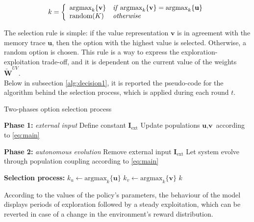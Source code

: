 \begin{equation*}
    k =
    \left\{
        \begin{array}{ll}
            \text{argmax}_{k}\{\textbf{v}\} & \text{\textit{if}}\; \text{argmax}_{k} \{\textbf{v}\} = \text{argmax}_{k} \{\textbf{u}\} \\
            \text{random}(K) & \text{\textit{otherwise}}
        \end{array}
    \right.
\end{equation*}

\noindent The selection rule is simple: if the value representation $\textbf{v}$ is in agreement with the memory trace $\textbf{u}$, then the option with the highest value is selected. Otherwise, a random option is chosen.
This rule is a way to express the exploration-exploitation trade-off, and it is dependent on the current value of the weights $\widetilde{\textbf{W}}^{UV}$. \\ Below in subsection \ref{alg:decision1}, it is reported the pseudo-code for the algorithm behind the selection process, which is applied during each round $t$.

\begin{algorithm}[ht]
\caption{Two-phases option selection process}
\label{alg:decision}
\SetAlgoLined
{}


\textbf{Phase 1:} \textit{external input} 
Define constant $\textbf{I}_{\text{ext}}$\;
Update populations $\textbf{u}, \textbf{v}$ according to \ref{eq:main}\;

\textbf{Phase 2:} \textit{autonomous evolution} 
Remove external input $\textbf{I}_{\text{ext}}$\;
Let system evolve through population coupling according to \ref{eq:main}\;

\textbf{Selection process:}\;
$k_{u} \gets \text{argmax}_{k}\{\textbf{u}\}$\;
$k_{v} \gets \text{argmax}_{k}\{\textbf{v}\}$\;
\Return $k$
\end{algorithm}\label{alg:decision1}

\noindent According to the values of the policy's parameters, the behaviour of the model displays periods of exploration followed by a steady exploitation, which can be reverted in case of a change in the environment's reward distribution.

